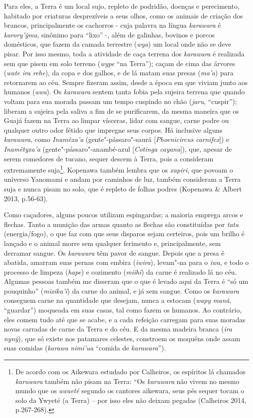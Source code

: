 Para eles, a Terra é um local sujo, repleto de podridão, doenças e
perecimento, habitado por criaturas desprezíveis a seus olhos, como os
animais de criação dos brancos, principalmente os cachorros - cuja
palavra na língua \emph{karawara} é \emph{karory'ỹma}, sinônimo para
``lixo'' -, além de galinhas, bovinos e porcos domésticos, que fazem da
camada terrestre (\emph{wya}) um local onde não se deve pisar. Por isso
mesmo, toda a atividade de caça terrena dos \emph{karawara} é realizada
sem que pisem em solo terreno (\emph{wype} ``na Terra''); caçam de cima
das árvores (\emph{wate ira rehe}), da copa e dos galhos, e de lá matam
suas presas (\emph{ma'a}) para retornarem ao céu. Sempre fizeram assim,
desde a época em que viviam junto aos humanos (\emph{awa}). Os
\emph{karawara} sentem tanta fobia pela sujeira terrena que quando
voltam para sua morada passam um tempo cuspindo no chão (\emph{jaru},
``cuspir''); liberam a sujeira pela saliva a fim de se purificarem, da
mesma maneira que os Guajá fazem na Terra ao limpar vísceras, lidar com
sangue, carne podre ou qualquer outro odor fétido que impregne seus
corpos. Há inclusive alguns \emph{karawara}, como \emph{Inamẽxa'a}
(gente"-pássaro"-saurá {[}\emph{Phoenicircus carnifex}{]}) e
\emph{Inamẽtyxa'a} (gente"-pássaro"-anambé-azul {[}\emph{Cotinga
cayana}{]}), que, apesar de serem comedores de tucano, sequer descem à
Terra, pois a consideram extremamente suja\footnote{De acordo com os
  Aikewara estudado por Calheiros, os espíritos lá chamados
  \emph{karuwara} também não pisam na Terra: ``Os \emph{karuwara} não
  vivem no mesmo mundo que os \emph{awaeté} segundo os cantores
  aikewara, seus pés sequer tocam o solo da Ywyeté (a Terra) -- por isso
  eles não deixam pegadas (Calheiros 2014, p.267-268).}. Kopenawa também
lembra que os \emph{xapiri}, que povoam o universo Yanomami e andam por
caminhos de luz, também consideram a Terra suja e nunca pisam no solo,
que é repleto de folhas podres (Kopenawa \& Albert 2013, p.56-63).

Como caçadores, alguns poucos utilizam espingardas; a maioria emprega
arcos e flechas. Tanto a munição das armas quanto as flechas são
constituídas por \emph{tata} (energia/fogo), o que faz com que seus
disparos sejam certeiros, pois um brilho é lançado e o animal morre sem
qualquer ferimento e, principalmente, sem derramar sangue. Os
\emph{karawara} têm pavor de sangue. Depois que a presa é abatida,
amarram suas pernas com embira (\emph{iwira}), levam"-na para o
\emph{iwa}, e todo o processo de limpeza (\emph{hape}) e cozimento
(\emph{miihĩ}) da carne é realizado lá no céu. Algumas pessoas também me
disseram que o que é levado aqui da Terra é ``só um pouquinho''
(\emph{mixika'ĩ}) da carne do animal, e já sem sangue. Como os
\emph{karawara} conseguem carne na quantidade que desejam, nunca a
estocam (\emph{wapy} \emph{manã}, ``guardar'') moqueada em suas casas, tal
como fazem os humanos. Ao contrário, eles comem tudo até que se acabe, e
a cada refeição carregam para suas moradas novas carradas de carne da
Terra e do céu. E da mesma madeira branca (\emph{ira} \emph{nynỹ}), que
só existe nos patamares celestes, constroem os moquéns onde assam suas
comidas (\emph{karawa nimi'ua} ``comida de \emph{karawara}'').

